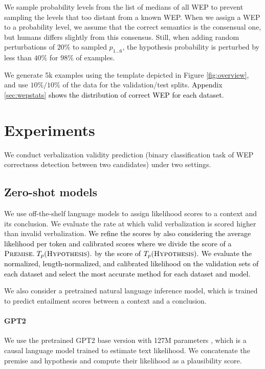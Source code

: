 \documentclass[11pt]{article}
\def \thecolor {black}
\newcommand{\blue}[1]{\textcolor{\thecolor}{#1}}
\begin{document}
We sample probability levels from the list of medians of all WEP to prevent sampling the levels that too distant from a known WEP. When we assign a WEP to a probability level, we assume that the correct semantics is the consensual one, but humans differs slightly from this consensus. Still, when adding random perturbations of $20\%$ to sampled $p_{1...6}$, the hypothesis probability is perturbed by less than $40\%$ for $98\%$ of examples.



We generate 5k examples using the template depicted in Figure \ref{fig:overview}, and use $10\%/10\%$ of the data for the validation/test splits. \blue{Appendix \ref{sec:wepstats} shows the distribution of correct WEP for each dataset.}


\section{Experiments}
We conduct verbalization validity prediction (binary classification task of WEP correctness detection between two candidates) under two settings.
\vspace{-1mm}
\subsection{Zero-shot models}
We use off-the-shelf language models to assign likelihood scores to a context and its conclusion. We evaluate the rate at which valid verbalization is scored higher than invalid verbalization. \blue{
We refine the scores by also considering the average likelihood per token \cite{brown2020language,schick-schutze-2021-exploiting} and calibrated scores \cite{brown2020language,pmlr-v139-zhao21c} where we divide the score of a $\textsc{Premise}.\;  T_p(\textsc{Hypothesis}).$ by the score of $T_p(\textsc{Hypothesis}).$ We evaluate the normalized, length-normalized, and calibrated likelihood on the validation sets of each dataset and select the most accurate method for each dataset and model.}

We also consider a pretrained natural language inference model, which is trained to predict entailment scores between a context and a conclusion.


\paragraph{GPT2} We use the pretrained GPT2 base version with 127M parameters \cite{radford2019language}, which is a causal language model trained to estimate text likelihood. We concatenate the premise and hypothesis and compute their likelihood as a plausibility score.
\vspace{-1mm}
\end{document}
